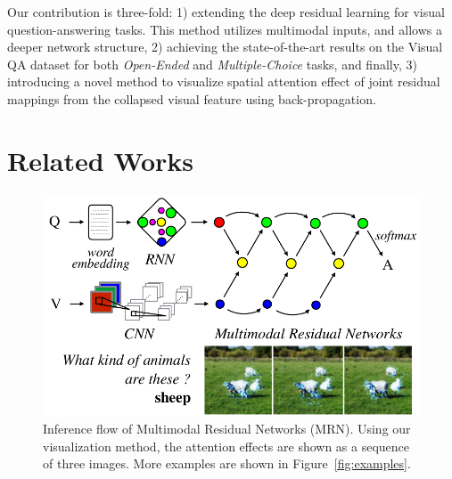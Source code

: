 \documentclass{article}
\begin{document}
Our contribution is three-fold: 1) extending the deep residual learning for visual question-answering tasks. This method utilizes multimodal inputs, and allows a deeper network structure, 2) achieving the state-of-the-art results on the Visual QA dataset for both \textit{Open-Ended} and \textit{Multiple-Choice} tasks, and finally, 3) introducing a novel method to visualize spatial attention effect of joint residual mappings from the collapsed visual feature using back-propagation.

\section{Related Works}

\begin{figure}[t]
\centering
\begin{minipage}{.55\textwidth}
  \centering
  \includegraphics[width=\linewidth]{drn_overview}
  \caption{Inference flow of Multimodal Residual Networks (MRN). Using our visualization method, the attention effects are shown as a sequence of three images. More examples are shown in Figure~\ref{fig:examples}.}
  \label{fig:overview}
\end{minipage}
\hspace{26pt}
\begin{minipage}{.36\textwidth}
  \centering

\end{minipage}
\end{figure}
\end{document}
